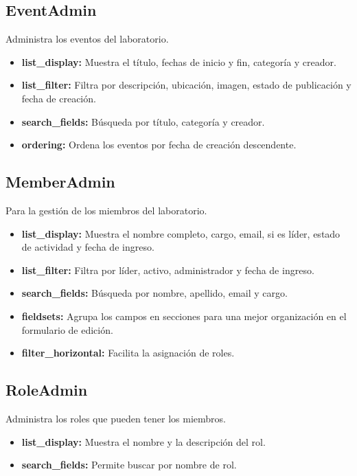 \subsection{EventAdmin}
Administra los eventos del laboratorio.
\begin{itemize}
    \item \textbf{list\_display:} Muestra el título, fechas de inicio y fin, categoría y creador.
    \item \textbf{list\_filter:} Filtra por descripción, ubicación, imagen, estado de publicación y fecha de creación.
    \item \textbf{search\_fields:} Búsqueda por título, categoría y creador.
    \item \textbf{ordering:} Ordena los eventos por fecha de creación descendente.
\end{itemize}

\subsection{MemberAdmin}
Para la gestión de los miembros del laboratorio.
\begin{itemize}
    \item \textbf{list\_display:} Muestra el nombre completo, cargo, email, si es líder, estado de actividad y fecha de ingreso.
    \item \textbf{list\_filter:} Filtra por líder, activo, administrador y fecha de ingreso.
    \item \textbf{search\_fields:} Búsqueda por nombre, apellido, email y cargo.
    \item \textbf{fieldsets:} Agrupa los campos en secciones para una mejor organización en el formulario de edición.
    \item \textbf{filter\_horizontal:} Facilita la asignación de roles.
\end{itemize}

\subsection{RoleAdmin}
Administra los roles que pueden tener los miembros.
\begin{itemize}
    \item \textbf{list\_display:} Muestra el nombre y la descripción del rol.
    \item \textbf{search\_fields:} Permite buscar por nombre de rol.
\end{itemize}

